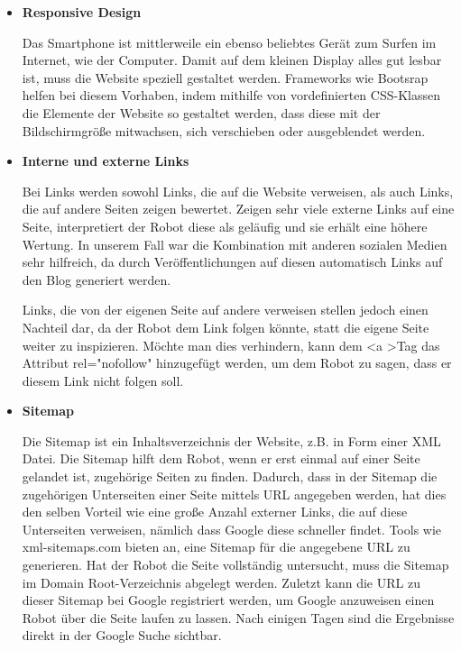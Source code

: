 {\begin{itemize}
        Im \textless body \textgreater, also im eigentlichen Inhalt der Website legt der Robot zum einen sehr viel Wert auf Struktur. Beispielsweise muss die Verschachtelung der Tags stimmen,
        oder der \textless h1 \textgreater Tag darf nur einmal pro Seite vorkommen.
        Zum anderen werden Inhalt und Code in Relation gesetzt. Wenn der Aufbau des HTML Dokuments sehr groß ist, in jedem Absatz jedoch nur ein Satz steht, kennt sich der Robot nicht aus.

      \item \textbf{Responsive Design}

        Das Smartphone ist mittlerweile ein ebenso beliebtes Gerät zum Surfen im Internet, wie der Computer. Damit auf dem kleinen Display alles gut lesbar ist, muss die Website speziell
        gestaltet werden. Frameworks wie Bootsrap helfen bei diesem Vorhaben, indem mithilfe von vordefinierten CSS-Klassen die Elemente der Website so gestaltet werden, dass diese mit der
        Bildschirmgröße mitwachsen, sich verschieben oder ausgeblendet werden.

      \item \textbf{Interne und externe Links}

        Bei Links werden sowohl Links, die auf die Website verweisen, als auch Links, die auf andere Seiten zeigen bewertet.
        Zeigen sehr viele externe Links auf eine Seite, interpretiert der Robot diese als geläufig und sie erhält eine höhere Wertung. In unserem Fall war die Kombination mit anderen sozialen
        Medien sehr hilfreich, da durch Veröffentlichungen auf diesen automatisch Links auf den Blog generiert werden.

        Links, die von der eigenen Seite auf andere verweisen stellen jedoch einen Nachteil dar, da der Robot dem Link folgen könnte, statt die eigene Seite weiter zu inspizieren. Möchte man dies
        verhindern, kann dem \textless a \textgreater Tag das Attribut rel="nofollow" hinzugefügt werden, um dem Robot zu sagen, dass er diesem Link nicht folgen soll.

      \item \textbf{Sitemap}

      	Die Sitemap ist ein Inhaltsverzeichnis der Website, z.B. in Form einer XML Datei. Die Sitemap hilft dem Robot, wenn er erst einmal auf einer Seite gelandet ist, zugehörige Seiten
        zu finden. Dadurch, dass in der Sitemap die zugehörigen Unterseiten einer Seite mittels URL angegeben werden, hat dies den selben Vorteil wie eine große Anzahl externer Links, die auf diese
        Unterseiten verweisen, nämlich dass Google diese schneller findet. Tools wie xml-sitemaps.com bieten an, eine Sitemap für die angegebene URL zu generieren. Hat der Robot die Seite vollständig
        untersucht, muss die Sitemap im Domain Root-Verzeichnis abgelegt werden. Zuletzt kann die URL zu dieser Sitemap bei Google registriert werden, um Google anzuweisen einen Robot über die Seite
        laufen zu lassen. Nach einigen Tagen sind die Ergebnisse direkt in der Google Suche sichtbar.


\end{itemize}}
